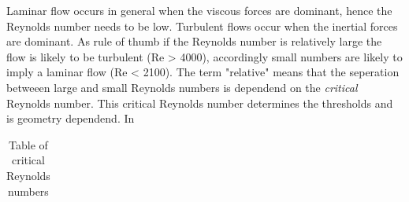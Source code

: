 Laminar flow occurs in general when the viscous forces are dominant, hence the Reynolds number needs to be low. Turbulent flows occur when the inertial forces are dominant. As rule of thumb if the Reynolds number is relatively large the flow is likely to be turbulent (Re > 4000), accordingly small numbers are likely to imply a laminar flow (Re < 2100).
The term "relative" means that the seperation betweeen large and small Reynolds numbers is dependend on the \emph{critical} Reynolds number. This critical Reynolds number determines the thresholds and is geometry dependend.
In 

\begin {table}[htp]
\begin{tabular}{lll}

\end{tabular}
\caption{Table of critical Reynolds numbers}
\end {table}




